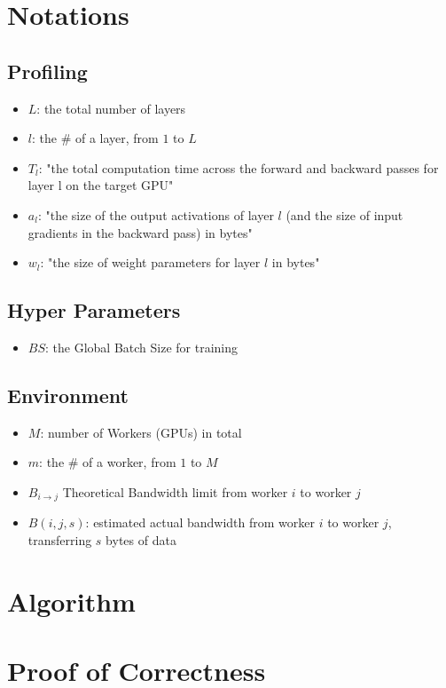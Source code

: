 \documentclass[12pt,letterpaper]{article}
\begin{document}
\section {Notations}
\subsection {Profiling}
\begin{itemize}
	\item $L$: the total number of layers
	\item $l$: the \# of a layer, from $1$ to $L$
	\item $T_l$: "the total computation time across the forward and backward passes for layer l on the target GPU"
	\item $a_l$: "the size of the output activations of layer $l$ (and the size of input gradients in the backward pass) in bytes"
	\item $w_l$: "the size of weight parameters for layer $l$ in bytes"
\end{itemize}
\subsection {Hyper Parameters}
\begin{itemize}
	\item $BS$: the Global Batch Size for training
\end{itemize}
\subsection {Environment}
\begin{itemize}
	\item $M$: number of Workers (GPUs) in total
	\item $m$: the \# of a worker, from $1$ to $M$
	\item $B_{i \rightarrow j}$ Theoretical Bandwidth limit from worker $i$ to worker $j$
	\item $B(i,j,s)$: estimated actual bandwidth from worker $i$ to worker $j$, transferring $s$ bytes of data
\end{itemize}

\section* {Algorithm}

\section* {Proof of Correctness}
\end{document}
